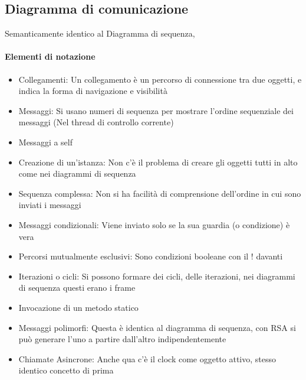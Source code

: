 \documentclass[12pt, a4paper, openany, twoside]{book}
\begin{document}
\subsection{Diagramma di comunicazione}
Semanticamente identico al Diagramma di sequenza,
\paragraph{Elementi di notazione}
\begin{itemize}
	\item Collegamenti: Un collegamento è un percorso di connessione tra due
	oggetti, e indica la forma di navigazione e visibilità
	\item Messaggi: Si usano numeri di sequenza per mostrare l'ordine sequenziale
	dei messaggi (Nel thread di controllo corrente)
	\item Messaggi a self
	\item Creazione di un'istanza: Non c'è il problema di creare gli oggetti
	tutti in alto come nei diagrammi di sequenza
	\item Sequenza complessa: Non si ha facilità di comprensione dell'ordine
	in cui sono inviati i messaggi
	\item Messaggi condizionali: Viene inviato solo se la sua guardia (o condizione)
	è vera
	\item Percorsi mutualmente esclusivi: Sono condizioni booleane con il ! davanti
	\item Iterazioni o cicli: Si possono formare dei cicli, delle iterazioni, 
	nei diagrammi di sequenza questi erano i frame
	\item Invocazione di un metodo statico 
	\item Messaggi polimorfi: Questa è identica al diagramma di sequenza, con 
	RSA si può generare l'uno a partire dall'altro indipendentemente
	\item Chiamate Asincrone: Anche qua c'è il clock come oggetto attivo, stesso
	identico concetto di prima
\end{itemize}
\end{document}
